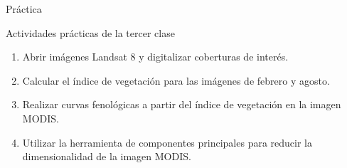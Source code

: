 \documentclass[handout]{beamer}
\begin{document}
\begin{frame}{Práctica}
  \begin{exampleblock}{Actividades prácticas de la tercer clase}
    \begin{enumerate}
      \item Abrir imágenes Landsat 8 y digitalizar coberturas de interés.
      \item Calcular el índice de vegetación para las imágenes de febrero y agosto.
      \item Realizar curvas fenológicas a partir del índice de
          vegetación en la imagen MODIS\@.
      \item Utilizar la herramienta de componentes principales para reducir la
          dimensionalidad de la imagen MODIS\@.
    \end{enumerate}
  \end{exampleblock}
\end{frame}
\end{document}
